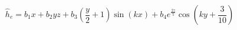$$
\hat h_e = b_1 x + b_2 y z + b_3 \left(\frac{y}{2} + 1\right) \sin{\left(k x \right)} + b_4 e^{\frac{2 z}{5}} \cos{\left(k y + \frac{3}{10} \right)}
$$
